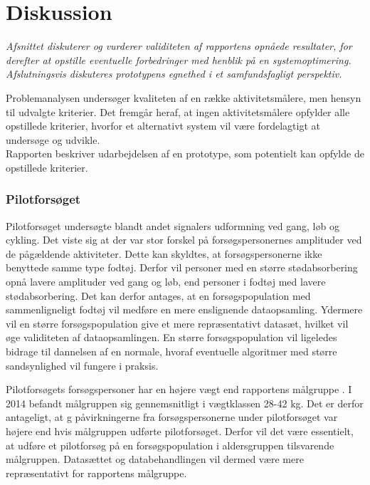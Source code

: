 \section{Diskussion}\label{sec:diskussion}
\textit{Afsnittet diskuterer og vurderer validiteten af rapportens opnåede resultater, for derefter at opstille eventuelle forbedringer med henblik på en systemoptimering. Afslutningsvis diskuteres prototypens egnethed i et samfundsfagligt perspektiv.}

Problemanalysen undersøger kvaliteten af en række aktivitetsmålere, men hensyn til udvalgte kriterier. Det fremgår heraf, at ingen aktivitetsmålere opfylder alle opstillede kriterier, hvorfor et alternativt system vil være fordelagtigt at undersøge og udvikle. \\
Rapporten beskriver udarbejdelsen af en prototype, som potentielt kan opfylde de opstillede kriterier. 

\subsubsection{Pilotforsøget}
Pilotforsøget undersøgte blandt andet signalers udformning ved gang, løb og cykling. Det viste sig at der var stor forskel på forsøgspersonernes amplituder ved de pågældende aktiviteter. Dette kan skyldtes, at forsøgspersonerne ikke benyttede samme type fodtøj. Derfor vil personer med en større stødabsorbering opnå lavere amplituder ved gang og løb, end personer i fodtøj med lavere stødabsorbering. Det kan derfor antages, at en forsøgspopulation med sammenligneligt fodtøj vil medføre en mere enslignende dataopsamling. Ydermere vil en større forsøgspopulation give et mere repræsentativt datasæt, hvilket vil øge validiteten af dataopsamlingen. En større forsøgspopulation vil ligeledes bidrage til dannelsen af en normale, hvoraf eventuelle algoritmer med større sandsynlighed vil fungere i praksis.

Pilotforsøgets forsøgspersoner har en højere vægt end rapportens målgruppe \citep{Rigsholspitalet2014}. I 2014 befandt målgruppen sig gennemsnitligt i vægtklassen 28-42 kg. Det er derfor antageligt, at g påvirkningerne fra forsøgspersonerne under pilotforsøget var højere end hvis målgruppen udførte pilotforsøget. Derfor vil det være essentielt, at udføre et pilotforsøg på en forsøgspopulation i aldersgruppen tilsvarende målgruppen. Datasættet og databehandlingen vil dermed være mere repræsentativt for rapportens målgruppe.

